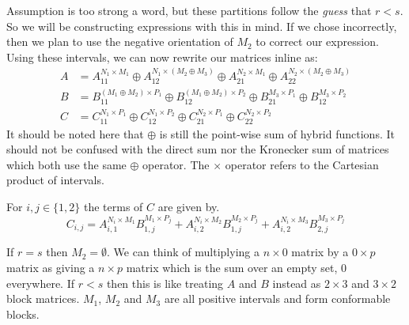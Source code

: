 Assumption is too strong a word, but these partitions follow the \emph{guess} that $r<s$.
So we will be constructing expressions with this in mind. 
If we chose incorrectly, then we plan to use the negative orientation of $M_2$ to correct our expression.
Using these intervals, we can now rewrite our matrices inline as:
\begin{align}
	A & =	A_{11}^{N_1 \times M_1} \oplus A_{12}^{N_1 \times (M_2 \oplus M_3)} \oplus 
			A_{21}^{N_2 \times M_1} \oplus A_{22}^{N_2 \times (M_2 \oplus M_3)} \\
	B & =	B_{11}^{(M_1 \oplus M_2) \times P_1} \oplus B_{12}^{(M_1 \oplus M_2) \times P_2} \oplus 
			B_{21}^{M_3 \times P_1} \oplus B_{12}^{M_3 \times P_2}\\
	C & =	C_{11}^{N_1 \times P_1} \oplus C_{12}^{N_1 \times P_2} \oplus
			C_{21}^{N_2 \times P_1} \oplus C_{22}^{N_2 \times P_2}
\end{align}
It should be noted here that $\oplus$ is still the point-wise sum of hybrid functions.
It should not be confused with the direct sum nor the Kronecker sum of matrices which both use the same $\oplus$ operator.
The $\times$ operator refers to the Cartesian product of intervals. 

For $i,j \in \{ 1,2 \}$ the terms of $C$ are given by.
\begin{equation}
	C_{i,j} 	= A_{i,1}^{N_i \times M_1} B_{1,j}^{M_1 \times P_j} 
			+ A_{i,2}^{N_i \times M_2} B_{1,j}^{M_2 \times P_j}
			+ A_{i,2}^{N_i \times M_3} B_{2,j}^{M_3 \times P_j}
\end{equation}

If $r=s$ then $M_2 = \emptyset$.
We can think of multiplying a $n \times 0$ matrix by a $0 \times p$ matrix as giving a $n \times p$ matrix which is the sum
over an empty set, 0 everywhere.
If $r < s$ then this is like treating $A$ and $B$ instead as $2 \times 3$ and $3 \times 2$ block matrices.
$M_1$, $M_2$ and $M_3$ are all positive intervals and form conformable blocks.

